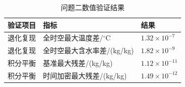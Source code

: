 \begin{table}[H]
  \centering
  \fontsize{10.5pt}{12.6pt}\selectfont
  \renewcommand{\arraystretch}{1.20}
  \captionsetup{font=small,labelfont=bf,textfont=bf}
  \caption{问题二数值验证结果}
  \label{tab:q2-validation}
  \begin{tabularx}{0.86\textwidth}{|>{\centering\arraybackslash}p{}|>{\centering\arraybackslash}p{}|>{\centering\arraybackslash}X|}
    \hline
    验证项目 & 指标 & 结果 \\
    \hline
    退化复现 & 全时空最大温度差/$^\circ\mathrm{C}$ & $1.32\times10^{-7}$ \\
    \hline
    退化复现 & 全时空最大含水率差/(kg/kg) & $1.82\times10^{-9}$ \\
    \hline
    积分平衡 & 基准最大残差/(kg/kg) & $1.12\times10^{-11}$ \\
    \hline
    积分平衡 & 时间加密最大残差/(kg/kg) & $1.49\times10^{-12}$ \\
    \hline
  \end{tabularx}
\end{table}

